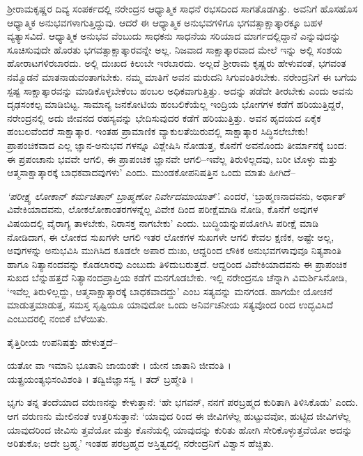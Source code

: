 ಶ್ರೀರಾಮಕೃಷ್ಣರ ದಿವ್ಯ ಸಂಪರ್ಕದಲ್ಲಿ ನರೇಂದ್ರನ ಆಧ್ಯಾತ್ಮಿಕ ಸಾಧನೆ ರಭಸದಿಂದ ಸಾಗತೊಡಗಿತ್ತು. ಅವನಿಗೆ ಹೊಸಹೊಸ ಆಧ್ಯಾತ್ಮಿಕ ಅನುಭವಗಳಾಗುತ್ತಿದ್ದುವು. ಆದರೆ ಈ ಆಧ್ಯಾತ್ಮಿಕ ಅನುಭವಗಳಿಗೂ ಭಗವತ್ಸಾಕ್ಷಾತ್ಕಾರಕ್ಕೂ ಬಹಳ ವ್ಯತ್ಯಾಸವಿದೆ. ಆಧ್ಯಾತ್ಮಿಕ ಅನುಭವ ವೆಂಬುದು ಸಾಧಕನು ಸಾಧನೆಯ ಸರಿಯಾದ ಮಾರ್ಗದಲ್ಲಿದ್ದಾನೆ ಎನ್ನುವುದನ್ನು ಸೂಚಿಸುವುದೇ ಹೊರತು ಭಗವತ್ಸಾಕ್ಷಾತ್ಕಾರವನ್ನೇ ಅಲ್ಲ. ನಿಜವಾದ ಸಾಕ್ಷಾತ್ಕಾರವಾದ ಮೇಲೆ ಇನ್ನು ಅಲ್ಲಿ ಸಂಶಯ ಹೋರಾಟಗಳಿರಬಾರದು. ಅಲ್ಲಿ ದುಃಖದ ಕಿಲುಬೇ ಇರಬಾರದು. ಅಲ್ಲದೆ ಶ್ರೀರಾಮ ಕೃಷ್ಣರು ಹೇಳುವಂತೆ, ಭಗವಂತ ನಮ್ಮೊಡನೆ ಮಾತನಾಡುವಂತಾಗಬೇಕು. ನಮ್ಮ ಮಾತಿಗೆ ಅವನ ಮರುದನಿ ಸಿಗುವಂತಿರಬೇಕು. ನರೇಂದ್ರನಿಗೆ ಈ ಬಗೆಯ ಸ್ಪಷ್ಟ ಸಾಕ್ಷಾತ್ಕಾರವನ್ನು ಮಾಡಿಕೊಳ್ಳಬೇಕೆಂಬ ಹಂಬಲ ಅಧಿಕವಾಗುತ್ತಿತ್ತು. ಅದನ್ನು ಪಡೆದೇ ತೀರಬೇಕು ಎಂದು ಅವನು ದೃಢಸಂಕಲ್ಪ ಮಾಡಿಬಿಟ್ಟ. ಸಾಮಾನ್ಯ ಜನಕೋಟಿಯ ಹಂಬಲಿಕೆಯೆಲ್ಲ ಇಂದ್ರಿಯ ಭೋಗಗಳ ಕಡೆಗೆ ಹರಿಯುತ್ತಿದ್ದರೆ, ನರೇಂದ್ರನಲ್ಲಿ ಅದು ಜೀವನದ ರಹಸ್ಯವನ್ನು ಭೇದಿಸುವುದರ ಕಡೆಗೆ ಹರಿಯುತ್ತಿತ್ತು. ಅವನ ಹೃದಯದ ಏಕೈಕ ಹಂಬಲವೆಂದರೆ ಸಾಕ್ಷಾತ್ಕಾರ. ಇಂತಹ ಪ್ರಾಮಾಣಿಕ ವ್ಯಾಕುಲತೆಯಿರುವಲ್ಲಿ ಸಾಕ್ಷಾತ್ಕಾರ ಸಿದ್ಧಿಸಲೇಬೇಕು! ಪ್ರಾಪಂಚಿಕವಾದ ಎಲ್ಲ ಜ್ಞಾನ-ಅನುಭವ ಗಳನ್ನೂ ವಿಶ್ಲೇಷಿಸಿ ನೋಡುತ್ತ, ಕೊನೆಗೆ ಅವನೊಂದು ತೀರ್ಮಾನಕ್ಕೆ ಬಂದ: ಈ ಪ್ರಪಂಚಾನು ಭವವೇ ಆಗಲಿ, ಈ ಪ್ರಾಪಂಚಿಕ ಜ್ಞಾನವೇ ಆಗಲಿ–ಇವೆಲ್ಲ ತಿರುಳಿಲ್ಲದವು, ಬರೀ ಟೊಳ್ಳು ಮತ್ತು ಆತ್ಮಸಾಕ್ಷಾತ್ಕಾರಕ್ಕೆ ಬಾಧಕವಾದವುಗಳು’ ಎಂದು. ಮುಂಡಕೋಪನಿಷತ್ತಿನ ಒಂದು ಮಾತು ಹೀಗಿದೆ–

\textit{‘ಪರೀಕ್ಷ್ಯ ಲೋಕಾನ್ ಕರ್ಮಚಿತಾನ್ ಬ್ರಾಹ್ಮಣೋ ನಿರ್ವೇದಮಾಯಾತ್’.} ಎಂದರೆ, ‘ಬ್ರಾಹ್ಮಣನಾದವನು, ಅರ್ಥಾತ್ ವಿವೇಕಿಯಾದವನು, ಲೋಕಲೋಕಾಂತರಗಳನ್ನೆಲ್ಲ ವಿವೇಕ ದಿಂದ ಪರೀಕ್ಷೆಮಾಡಿ ನೋಡಿ, ಕೊನೆಗೆ ಅವುಗಳ ವಿಷಯದಲ್ಲಿ ವೈರಾಗ್ಯ ತಾಳಬೇಕು, ನಿರಾಸಕ್ತ ನಾಗಬೇಕು’ ಎಂದು. ಬುದ್ಧಿಯನ್ನುಪಯೋಗಿಸಿ ಪರೀಕ್ಷೆ ಮಾಡಿ ನೋಡಿದಾಗ, ಈ ಲೋಕದ ಸುಖಗಳೇ ಆಗಲಿ ಇತರ ಲೋಕಗಳ ಸುಖಗಳೇ ಆಗಲಿ ಕೇವಲ ಕ್ಷಣಿಕ, ಅಷ್ಟೇ ಅಲ್ಲ, ಅವುಗಳನ್ನು ಅನುಭವಿಸಿ ಮುಗಿಸಿದ ಕೂಡಲೇ ಅಪಾರ ದುಃಖ, ಆದ್ದರಿಂದ ಲೌಕಿಕ ಅನುಭವಗಳಾವುವೂ ನಿತ್ಯಶಾಂತಿ ಹಾಗೂ ನಿತ್ಯಾನಂದವನ್ನು ಕೊಡಲಾರವು ಎಂಬುದು ತಿಳಿದುಬರುತ್ತದೆ. ಆದ್ದರಿಂದ ವಿವೇಕಿಯಾದವನು ಈ ಪ್ರಾಪಂಚಿಕ ಸುಖದ ಬೆನ್ನುಹತ್ತದೆ ನಿತ್ಯಾನಂದಪ್ರಾಪ್ತಿಯ ಕಡೆಗೆ ಮನಗೊಡಬೇಕು. ಇಲ್ಲಿ ನರೇಂದ್ರನೂ ಚೆನ್ನಾಗಿ ವಿಮರ್ಶಿಸಿನೋಡಿ, ‘ಇವೆಲ್ಲ ತಿರುಳಿಲ್ಲದ್ದು, ಆತ್ಮಸಾಕ್ಷಾತ್ಕಾರಕ್ಕೆ ಬಾಧಕವಾದದ್ದು’ ಎಂಬ ಸತ್ಯವನ್ನು ಮನಗಂಡ. ಹಾಗಯೇ ಯೋಚನೆ ಮಾಡುತ್ತಮಾಡುತ್ತ, ಸಮಸ್ತ ಸೃಷ್ಟಿಯೂ ಯಾವುದೋ ಒಂದು ಅನಿರ್ವಚನೀಯ ಸತ್ಯವೊಂದ ರಿಂದ ಉದ್ಭವಿಸಿದೆ ಎಂಬುದರಲ್ಲಿ ನಂಬಿಕೆ ಬೆಳೆಯಿತು. 

ತೈತ್ತಿರೀಯ ಉಪನಿಷತ್ತು ಹೇಳುತ್ತದೆ–

\begin{myquote}
ಯತೋ ವಾ ಇಮಾನಿ ಭೂತಾನಿ ಜಾಯಂತೇ । ಯೇನ ಜಾತಾನಿ ಜೀವಂತಿ ।\\ಯತ್ಪ್ರಯಂತ್ಯಭಿಸಂವಿಶಂತಿ । ತದ್ವಿಜಿಜ್ಞಾಸಸ್ವ । ತದ್ ಬ್ರಹ್ಮೇತಿ ।
\end{myquote}

ಭೃಗು ತನ್ನ ತಂದೆಯಾದ ವರುಣನನ್ನು ಕೇಳುತ್ತಾನೆ: ‘ಹೇ ಭಗವನ್, ನನಗೆ ಪರಬ್ರಹ್ಮದ ಕುರಿತಾಗಿ ತಿಳಿಸಿಕೊಡು’ ಎಂದು. ಆಗ ವರುಣನು ಮೇಲಿನಂತೆ ಉತ್ತರಿಸುತ್ತಾನೆ: ‘ಯಾವುದ ರಿಂದ ಈ ಜೀವಿಗಳೆಲ್ಲ ಹುಟ್ಟುವವೋ, ಹುಟ್ಟಿದ ಜೀವಿಗಳೆಲ್ಲ ಯಾವುದರಿಂದ ಜೀವಿಸು ತ್ತವೆಯೋ ಮತ್ತು ಕೊನೆಯಲ್ಲಿ ಯಾವುದನ್ನು ಕುರಿತು ಹೋಗಿ ಸೇರಿಕೊಳ್ಳುತ್ತವೆಯೋ ಅದನ್ನು ಅರಿತುಕೊ; ಅದೇ ಬ್ರಹ್ಮ.’ ಇಂತಹ ಪರಬ್ರಹ್ಮದ ಅಸ್ತಿತ್ವದಲ್ಲಿ ನರೇಂದ್ರನಿಗೆ ವಿಶ್ವಾಸ ಹೆಚ್ಚಿತು.

